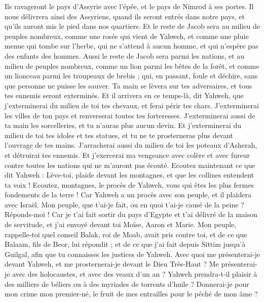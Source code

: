 \begin{multicols}{2}
Ils ravageront le pays d'Assyrie avec l'épée, et le pays de Nimrod à ses portes. Il nous délivrera ainsi des Assyriens, quand ils seront entrés dans notre pays, et qu'ils auront mis le pied dans nos quartiers.
Et le reste de Jacob sera au milieu de peuples nombreux, comme une rosée qui vient de Yahweh, et comme une pluie menue qui tombe sur l'herbe, qui ne s'attend à aucun homme, et qui n'espère pas des enfants des hommes.
Aussi le reste de Jacob sera parmi les nations, et au milieu de peuples nombreux, comme un lion parmi les bêtes de la forêt, et comme un lionceau parmi les troupeaux de brebis ; qui, en passant, foule et déchire, sans que personne ne puisse les sauver.
Ta main se lèvera sur tes adversaires, et tous tes ennemis seront exterminés.
Et il arrivera en ce temps-là, dit Yahweh, que j'exterminerai du milieu de toi tes chevaux, et ferai périr tes chars.
J'exterminerai les villes de ton pays et renverserai toutes tes forteresses.
J'exterminerai aussi de ta main les sorcelleries, et tu n'auras plus aucun devin.
Et j'exterminerai du milieu de toi tes idoles et tes statues, et tu ne te prosterneras plus devant l'ouvrage de tes mains.
J'arracherai aussi du milieu de toi les poteaux d'Asherah, et détruirai tes ennemis.
Et j'exercerai ma vengeance avec colère et avec fureur contre toutes les nations qui ne m'auront pas écouté.
\VerseOne{}Ecoutez maintenant ce que dit Yahweh : Lève-toi, plaide devant les montagnes, et que les collines entendent ta voix !
Ecoutez, montagnes, le procès de Yahweh, vous qui êtes les plus fermes fondements de la terre ! Car Yahweh a un procès avec son peuple, et il plaidera avec Israël.
Mon peuple, que t'ai-je fait, ou en quoi t'ai-je causé de la peine ? Réponds-moi !
Car je t'ai fait sortir du pays d'Egypte et t'ai délivré de la maison de servitude, et j'ai envoyé devant toi Moïse, Aaron et Marie.
Mon peuple, rappelle-toi quel conseil Balak, roi de Moab, avait pris contre toi, et de ce que Balaam, fils de Beor, lui répondit ; et de ce que j'ai fait depuis Sittim jusqu'à Guilgal, afin que tu connaisses les justices de Yahweh.
Avec quoi me présenterai-je devant Yahweh, et me prosternerai-je devant le Dieu Très-Haut ? Me présenterai-je avec des holocaustes, et avec des veaux d'un an ?
Yahweh prendra-t-il plaisir à des milliers de béliers ou à des myriades de torrents d'huile ? Donnerai-je pour mon crime mon premier-né, le fruit de mes entrailles pour le péché de mon âme ?

\end{multicols}
